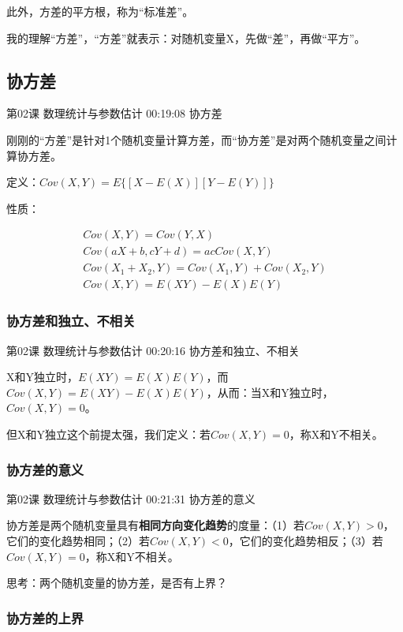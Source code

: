 \documentclass[UTF8]{ctexbook}
\begin{document}
此外，方差的平方根，称为“标准差”。

我的理解“方差”，“方差”就表示：对随机变量X，先做“差”，再做“平方”。

\subsection{协方差}

第02课 数理统计与参数估计 00:19:08 协方差

刚刚的“方差”是针对1个随机变量计算方差，而“协方差”是对两个随机变量之间计算协方差。

定义：$Cov(X,Y)=E\{  [X-E(X)][Y-E(Y)] \}$

性质：

\begin{equation}
\begin{aligned}
Cov(X,Y)=Cov(Y,X) \\
Cov(aX+b,cY+d)=acCov(X,Y)\\
Cov(X_{1}+X_{2},Y)=Cov(X_{1},Y)+Cov(X_{2},Y) \\
Cov(X,Y)=E(XY)-E(X)E(Y)
\end{aligned}
\end{equation}


\subsubsection{协方差和独立、不相关}

第02课 数理统计与参数估计 00:20:16 协方差和独立、不相关

X和Y独立时，$E(XY)=E(X)E(Y)$，而$Cov(X,Y)=E(XY)-E(X)E(Y)$，从而：当X和Y独立时，$Cov(X,Y)=0$。

但X和Y独立这个前提太强，我们定义：若$Cov(X,Y)=0$，称X和Y不相关。

\subsubsection{协方差的意义}

第02课 数理统计与参数估计 00:21:31 协方差的意义

协方差是两个随机变量具有\textbf{相同方向变化趋势}的度量：（1）若$Cov(X,Y) > 0$，它们的变化趋势相同；（2）若$Cov(X,Y) < 0$，它们的变化趋势相反；（3）若$Cov(X,Y)=0$，称X和Y不相关。

思考：两个随机变量的协方差，是否有上界？

\subsubsection{协方差的上界}
\end{document}
